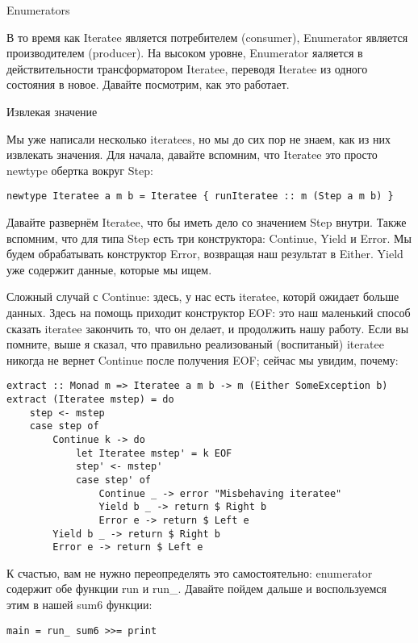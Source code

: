 Enumerators

В то время как Iteratee является потребителем (consumer), Enumerator является производителем (producer). На высоком уровне, Enumerator яаляется в действительности трансформатором Iteratee, переводя Iteratee из одного состояния в новое. Давайте посмотрим, как это работает.

Извлекая значение

Мы уже написали несколько iteratees, но мы до сих пор не знаем, как из них извлекать значения. Для начала, давайте вспомним, что Iteratee это просто newtype обертка вокруг Step:

\begin{lstlisting}
newtype Iteratee a m b = Iteratee { runIteratee :: m (Step a m b) }
\end{lstlisting}

Давайте развернём Iteratee, что бы иметь дело со значением Step внутри. Также вспомним, что для типа Step есть три конструктора: Continue, Yield и Error. Мы будем обрабатывать конструктор Error, возвращая наш результат в Either. Yield уже содержит данные, которые мы ищем.

Сложный случай с Continue: здесь, у нас есть iteratee, которй  ожидает больше данных. Здесь на помощь приходит конструктор EOF: это наш маленький способ сказать iteratee закончить то, что он делает, и продолжить нашу работу. Если вы помните, выше я сказал, что правильно реализованый (воспитаный) iteratee никогда не вернет Continue после получения EOF; сейчас мы увидим, почему:

\begin{lstlisting}
extract :: Monad m => Iteratee a m b -> m (Either SomeException b)
extract (Iteratee mstep) = do
    step <- mstep
    case step of
        Continue k -> do
            let Iteratee mstep' = k EOF
            step' <- mstep'
            case step' of
                Continue _ -> error "Misbehaving iteratee"
                Yield b _ -> return $ Right b
                Error e -> return $ Left e
        Yield b _ -> return $ Right b
        Error e -> return $ Left e
\end{lstlisting}

К счастью, вам не нужно переопределять это самостоятельно: enumerator содержит обе функции run и run_. Давайте пойдем дальше и воспользуемся этим в нашей sum6 функции:

\begin{lstlisting}
main = run_ sum6 >>= print
\end{lstlisting}

